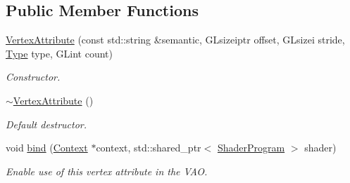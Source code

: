 \subsection*{Public Member Functions}
\begin{DoxyCompactItemize}
\item 
\hyperlink{class_vertex_attribute_afe863b8c7c1387ddf85f84f4514cd11c}{Vertex\+Attribute} (const std\+::string \&semantic, G\+Lsizeiptr offset, G\+Lsizei stride, \hyperlink{class_vertex_attribute_abe7f703a33ec0d67ecd975c08dc33f9b}{Type} type, G\+Lint count)
\begin{DoxyCompactList}\small\item\em Constructor. \end{DoxyCompactList}\item 
\hyperlink{class_vertex_attribute_a21b60c2cd1acad3d3f6a9fed9156f335}{$\sim$\+Vertex\+Attribute} ()
\begin{DoxyCompactList}\small\item\em Default destructor. \end{DoxyCompactList}\item 
void \hyperlink{class_vertex_attribute_a4b554dd320723193c6d75b0ef76f6ccc}{bind} (\hyperlink{class_context}{Context} $\ast$context, std\+::shared\+\_\+ptr$<$ \hyperlink{class_shader_program}{Shader\+Program} $>$ shader)
\begin{DoxyCompactList}\small\item\em Enable use of this vertex attribute in the V\+AO. \end{DoxyCompactList}\end{DoxyCompactItemize}
